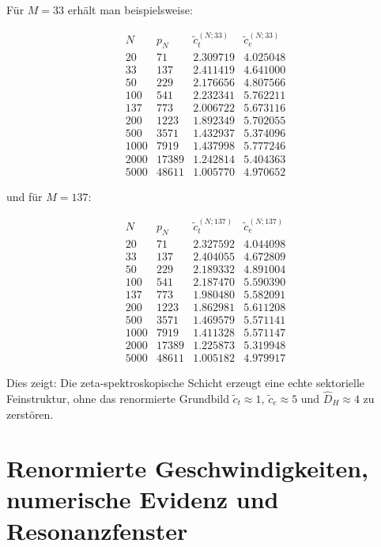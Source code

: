 \documentclass[12pt,a4paper]{article}
\theoremstyle{definition}
\begin{document}
	Für \(M=33\) erhält man beispielsweise:
	
	\[
	\begin{array}{r|r|r|r}
		N & p_N & \tilde c_t^{(N;33)} & \tilde c_e^{(N;33)}\\
		\hline
		20   & 71    & 2.309719 & 4.025048 \\
		33   & 137   & 2.411419 & 4.641000 \\
		50   & 229   & 2.176656 & 4.807566 \\
		100  & 541   & 2.232341 & 5.762211 \\
		137  & 773   & 2.006722 & 5.673116 \\
		200  & 1223  & 1.892349 & 5.702055 \\
		500  & 3571  & 1.432937 & 5.374096 \\
		1000 & 7919  & 1.437998 & 5.777246 \\
		2000 & 17389 & 1.242814 & 5.404363 \\
		5000 & 48611 & 1.005770 & 4.970652
	\end{array}
	\]
	
	und für \(M=137\):
	
	\[
	\begin{array}{r|r|r|r}
		N & p_N & \tilde c_t^{(N;137)} & \tilde c_e^{(N;137)}\\
		\hline
		20   & 71    & 2.327592 & 4.044098 \\
		33   & 137   & 2.404055 & 4.672809 \\
		50   & 229   & 2.189332 & 4.891004 \\
		100  & 541   & 2.187470 & 5.590390 \\
		137  & 773   & 1.980480 & 5.582091 \\
		200  & 1223  & 1.862981 & 5.611208 \\
		500  & 3571  & 1.469579 & 5.571141 \\
		1000 & 7919  & 1.411328 & 5.571147 \\
		2000 & 17389 & 1.225873 & 5.319948 \\
		5000 & 48611 & 1.005182 & 4.979917
	\end{array}
	\]
	
	Dies zeigt: Die zeta-spektroskopische Schicht erzeugt eine echte sektorielle Feinstruktur, ohne das renormierte Grundbild \(\tilde c_t\approx 1\), \(\tilde c_e\approx 5\) und \(\widehat D_H\approx 4\) zu zerstören.
	
	
	\section{Renormierte Geschwindigkeiten, numerische Evidenz und Resonanzfenster}
	
\end{document}
